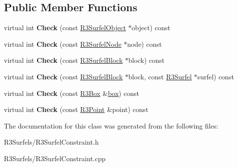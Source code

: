\subsection*{Public Member Functions}
\begin{DoxyCompactItemize}
\item 
virtual int {\bfseries Check} (const \hyperlink{class_r3_surfel_object}{R3\+Surfel\+Object} $\ast$object) const \hypertarget{class_r3_surfel_constraint_ada17b4eff1d7e1e0b20e4cb3922958e6}{}\label{class_r3_surfel_constraint_ada17b4eff1d7e1e0b20e4cb3922958e6}

\item 
virtual int {\bfseries Check} (const \hyperlink{class_r3_surfel_node}{R3\+Surfel\+Node} $\ast$node) const \hypertarget{class_r3_surfel_constraint_a5b81e7fb681cf2396544b62088b5571f}{}\label{class_r3_surfel_constraint_a5b81e7fb681cf2396544b62088b5571f}

\item 
virtual int {\bfseries Check} (const \hyperlink{class_r3_surfel_block}{R3\+Surfel\+Block} $\ast$block) const \hypertarget{class_r3_surfel_constraint_af4a15876be35993bf11c4bca287995af}{}\label{class_r3_surfel_constraint_af4a15876be35993bf11c4bca287995af}

\item 
virtual int {\bfseries Check} (const \hyperlink{class_r3_surfel_block}{R3\+Surfel\+Block} $\ast$block, const \hyperlink{class_r3_surfel}{R3\+Surfel} $\ast$surfel) const \hypertarget{class_r3_surfel_constraint_a4e7fda8cd9e795f18fbb7d9ff7b0a8ee}{}\label{class_r3_surfel_constraint_a4e7fda8cd9e795f18fbb7d9ff7b0a8ee}

\item 
virtual int {\bfseries Check} (const \hyperlink{class_r3_box}{R3\+Box} \&\hyperlink{structbox}{box}) const \hypertarget{class_r3_surfel_constraint_a50990acb5aa1007511352201a08cbef5}{}\label{class_r3_surfel_constraint_a50990acb5aa1007511352201a08cbef5}

\item 
virtual int {\bfseries Check} (const \hyperlink{class_r3_point}{R3\+Point} \&point) const \hypertarget{class_r3_surfel_constraint_ae050bee7798580b22a62007db618aa3e}{}\label{class_r3_surfel_constraint_ae050bee7798580b22a62007db618aa3e}

\end{DoxyCompactItemize}


The documentation for this class was generated from the following files\+:\begin{DoxyCompactItemize}
\item 
R3\+Surfels/R3\+Surfel\+Constraint.\+h\item 
R3\+Surfels/R3\+Surfel\+Constraint.\+cpp\end{DoxyCompactItemize}
